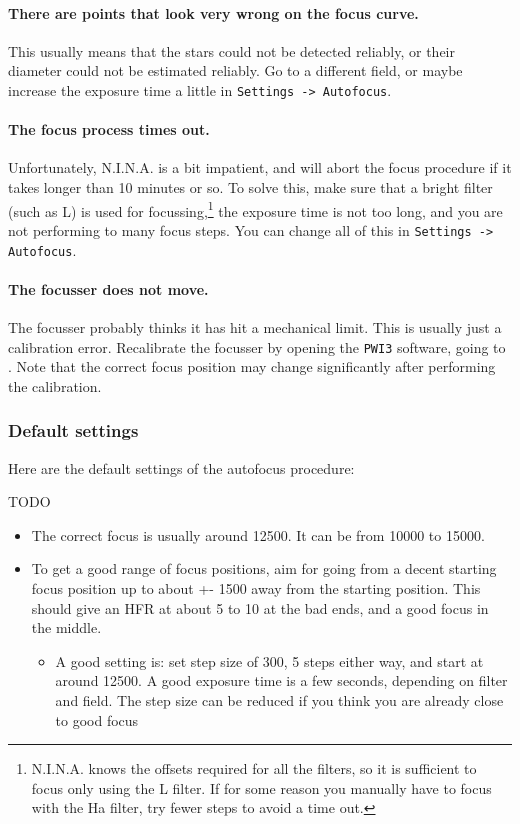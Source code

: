 \documentclass[a4paper, 11pt, fleqn]{memoir}
\begin{document}
\paragraph*{There are points that look very wrong on the focus curve.}
This usually means that the stars could not be detected reliably, or their diameter could not be estimated reliably.
Go to a different field, or maybe increase the exposure time a little in \texttt{Settings -> Autofocus}.

\paragraph*{The focus process times out.}
Unfortunately, N.I.N.A.
is a bit impatient, and will abort the focus procedure if it takes longer than 10 minutes or so.
To solve this, make sure that a bright filter (such as L) is used for focussing,\footnote{N.I.N.A.
    knows the offsets required for all the filters, so it is sufficient to focus only using the L filter.
    If for some reason you manually have to focus with the Ha filter, try fewer steps to avoid a time out.
} the exposure time is not too long, and you are not performing to many focus steps.
You can change all of this in \texttt{Settings -> Autofocus}.

\paragraph*{The focusser does not move.}
The focusser probably thinks it has hit a mechanical limit.
This is usually just a calibration error.
Recalibrate the focusser by opening the \texttt{PWI3} software, going to .
Note that the correct focus position may change significantly after performing the calibration.

\subsubsection*{Default settings}
Here are the default settings of the autofocus procedure:

TODO

\begin{itemize}
    \item The correct focus is usually around 12500.
          It can be from 10000 to 15000.
    \item
          To get a good range of focus positions, aim for going
          from a decent starting focus position up to about +- 1500 away from the starting position.
          This should give an HFR at about 5 to 10 at the bad ends, and a good focus in the middle.
          \begin{itemize}
              \item
                    A good setting is: set step size of 300, 5 steps either way, and start at
                    around 12500.
                    A good exposure time is a few seconds, depending on filter and field.
                    The step size can be reduced if you think you are already close to good focus
          \end{itemize}
\end{itemize}
\end{document}
